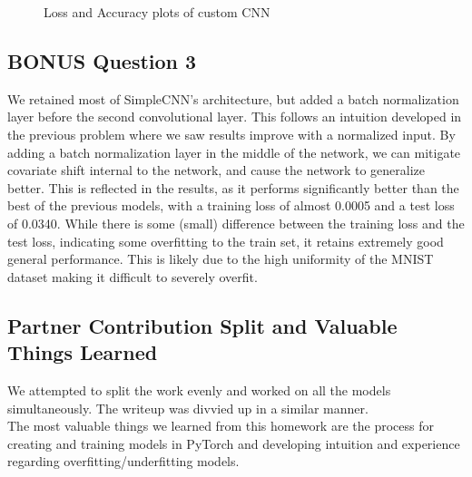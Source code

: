 \documentclass{article}
\begin{document}
\begin{figure}[H]
    \noindent
    \label{fig3}
    \caption{Loss and Accuracy plots of custom CNN}
\end{figure}

\subsection{BONUS Question 3}
We retained most of SimpleCNN's architecture, but added a batch normalization layer before the second convolutional layer. This follows an intuition developed in the previous problem where we saw results improve with a normalized input. By adding a batch normalization layer in the middle of the network, we can mitigate covariate shift internal to the network, and cause the network to generalize better. This is reflected in the results, as it performs significantly better than the best of the previous models, with a training loss of almost 0.0005 and a test loss of 0.0340. While there is some (small) difference between the training loss and the test loss, indicating some overfitting to the train set, it retains extremely good general performance. This is likely due to the high uniformity of the MNIST dataset making it difficult to severely overfit. 

\subsection{Partner Contribution Split and Valuable Things Learned}
We attempted to split the work evenly and worked on all the models simultaneously. The writeup was divvied up in a similar manner. \\
The most valuable things we learned from this homework are the process for creating and training models in PyTorch and developing intuition and experience regarding overfitting/underfitting models.
\end{document}
